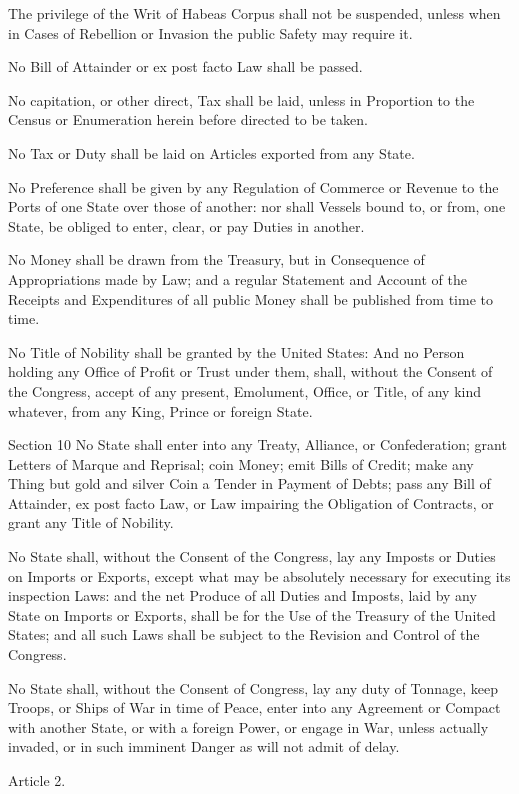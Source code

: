 \documentclass[12pt,a4paper]{article}
\begin{document}
The privilege of the Writ of Habeas Corpus shall not be suspended, unless when
in Cases of Rebellion or Invasion the public Safety may require it.

No Bill of Attainder or ex post facto Law shall be passed.

No capitation, or other direct, Tax shall be laid, unless in Proportion to the
Census or Enumeration herein before directed to be taken.

No Tax or Duty shall be laid on Articles exported from any State.

No Preference shall be given by any Regulation of Commerce or Revenue to the
Ports of one State over those of another: nor shall Vessels bound to, or from,
one State, be obliged to enter, clear, or pay Duties in another.

No Money shall be drawn from the Treasury, but in Consequence of Appropriations
made by Law; and a regular Statement and Account of the Receipts and
Expenditures of all public Money shall be published from time to time.

No Title of Nobility shall be granted by the United States: And no Person
holding any Office of Profit or Trust under them, shall, without the Consent of
the Congress, accept of any present, Emolument, Office, or Title, of any kind
whatever, from any King, Prince or foreign State.

Section 10
No State shall enter into any Treaty, Alliance, or Confederation; grant Letters
of Marque and Reprisal; coin Money; emit Bills of Credit; make any Thing but
gold and silver Coin a Tender in Payment of Debts; pass any Bill of Attainder,
ex post facto Law, or Law impairing the Obligation of Contracts, or grant any
Title of Nobility.

No State shall, without the Consent of the Congress, lay any Imposts or Duties
on Imports or Exports, except what may be absolutely necessary for executing
its inspection Laws: and the net Produce of all Duties and Imposts, laid by
any State on Imports or Exports, shall be for the Use of the Treasury of the
United States; and all such Laws shall be subject to the Revision and Control
of the Congress.

No State shall, without the Consent of Congress, lay any duty of Tonnage, keep
Troops, or Ships of War in time of Peace, enter into any Agreement or Compact
with another State, or with a foreign Power, or engage in War, unless actually
invaded, or in such imminent Danger as will not admit of delay.

Article 2.
\end{document}
